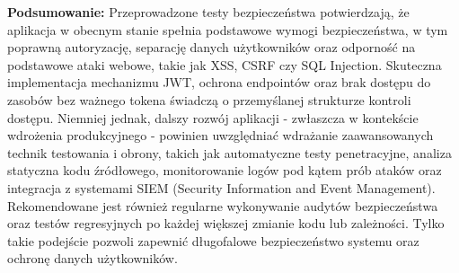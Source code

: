 \textbf{Podsumowanie:} Przeprowadzone testy bezpieczeństwa potwierdzają, że aplikacja w obecnym stanie spełnia podstawowe wymogi bezpieczeństwa, w tym poprawną autoryzację, separację danych użytkowników oraz odporność na podstawowe ataki webowe, takie jak XSS, CSRF czy SQL Injection. Skuteczna implementacja mechanizmu JWT, ochrona endpointów oraz brak dostępu do zasobów bez ważnego tokena świadczą o przemyślanej strukturze kontroli dostępu. Niemniej jednak, dalszy rozwój aplikacji - zwłaszcza w kontekście wdrożenia produkcyjnego - powinien uwzględniać wdrażanie zaawansowanych technik testowania i obrony, takich jak automatyczne testy penetracyjne, analiza statyczna kodu źródłowego, monitorowanie logów pod kątem prób ataków oraz integracja z systemami SIEM (Security Information and Event Management). Rekomendowane jest również regularne wykonywanie audytów bezpieczeństwa oraz testów regresyjnych po każdej większej zmianie kodu lub zależności. Tylko takie podejście pozwoli zapewnić długofalowe bezpieczeństwo systemu oraz ochronę danych użytkowników.